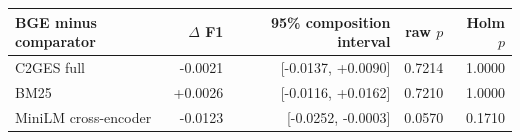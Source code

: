 \begin{tabular}{lrrrr}
\toprule
BGE minus comparator & $\Delta$ F1 & 95\% composition interval & raw $p$ & Holm $p$ \\
\midrule
C2GES full & -0.0021 & [-0.0137, +0.0090] & 0.7214 & 1.0000 \\
BM25 & +0.0026 & [-0.0116, +0.0162] & 0.7210 & 1.0000 \\
MiniLM cross-encoder & -0.0123 & [-0.0252, -0.0003] & 0.0570 & 0.1710 \\
\bottomrule
\end{tabular}
